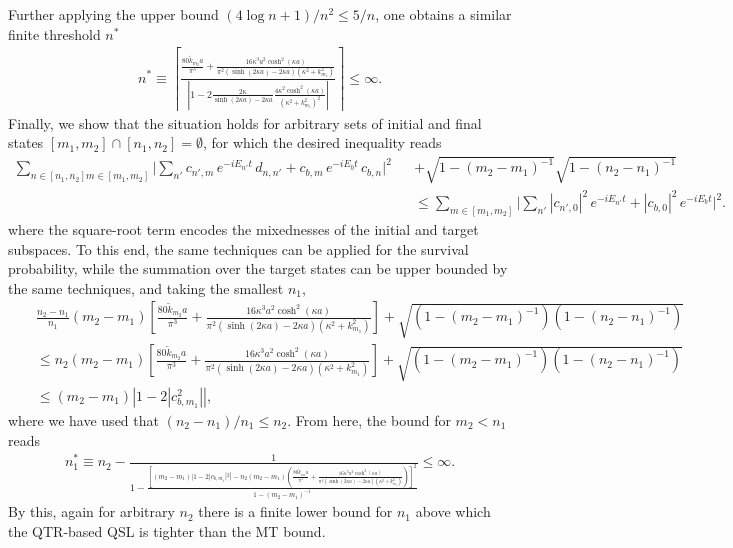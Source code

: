 \documentclass[prl,aps,amssymb,twocolumn,superscriptaddress, notitlepage, longbibliography]{revtex4-2}
\begin{document}
Further applying the upper bound $(4\log n+1)/n^2\leq 5/n$, one obtains a similar finite threshold $n^*$
\begin{eqnarray}
    n^*\equiv \left\lceil\frac{\frac{80\tilde k_{m_2}a}{\pi^3}+\frac{16\kappa^3a^2\cosh^2(\kappa a)}{\pi^2(\sinh(2\kappa a)-2\kappa a)(\kappa^2+k^2_{m_1})}}{\left\lvert1-2\frac{2\kappa}{\sinh(2\kappa a)-2\kappa a}\frac{4\kappa^2\cosh^2(\kappa a)}{(\kappa^2+k^2_{m_1})^2}\right\rvert}\right\rceil\leq \infty.
\end{eqnarray}
Finally, we show that the situation holds for arbitrary sets of initial and final states $[m_1,m_2]\cap[n_1,n_2]=\emptyset$, for which the desired inequality reads
\begin{eqnarray}
    \sum_{n\in[n_1,n_2]m\in[m_1,m_2]}\Bigg|
\sum_{n'} c_{n',m} \, e^{-i E_{n'} t} \, d_{n,n'} + c_{b,m} \, e^{-i E_b t} \, c_{b,n}
\Bigg|^2&&+\sqrt{1-(m_2-m_1)^{-1}}\sqrt{1-(n_2-n_1)^{-1}}\\
&&\leq\sum_{m\in[m_1,m_2]}\Bigg| \sum_{n'} |c_{n',0}|^2 \, e^{-i E_{n'} t} + |c_{b,0}|^2 \, e^{-i E_b t} \Bigg|^2.\nonumber
\end{eqnarray}
where the square-root term encodes the mixednesses of the initial and target subspaces.
To this end, the same techniques can be applied for the survival probability, while the summation over the target states can be upper bounded by the same techniques, and taking the smallest $n_1$,
\begin{eqnarray}
    &&\frac{n_2-n_1}{n_1}(m_2-m_1)\left[\frac{80\tilde k_{m_2}a}{\pi^3}+\frac{16\kappa^3a^2\cosh^2(\kappa a)}{\pi^2(\sinh(2\kappa a)-2\kappa a)(\kappa^2+k^2_{m_1})}\right]+\sqrt{\left(1-(m_2-m_1)^{-1}\right)\left(1-(n_2-n_1)^{-1}\right)}\\
    &&\leq n_2(m_2-m_1)\left[\frac{80\tilde k_{m_2}a}{\pi^3}+\frac{16\kappa^3a^2\cosh^2(\kappa a)}{\pi^2(\sinh(2\kappa a)-2\kappa a)(\kappa^2+k^2_{m_1})}\right]+\sqrt{\left(1-(m_2-m_1)^{-1}\right)\left(1-(n_2-n_1)^{-1}\right)}\nonumber\\
    &&\leq (m_2-m_1)\left|1-2|c_{b,m_1}^2|\right|,\nonumber
\end{eqnarray}
where we have used that $(n_2-n_1)/n_1\leq n_2$. From here, the bound for $m_2<n_1$ reads
\begin{eqnarray}
    n^*_1\equiv n_2-\frac{1}{1-\frac{\left[(m_2-m_1)|1-2|c_{b,m_1}|^2|-n_2(m_2-m_1)\left(\frac{80 \tilde k_{m_2}a}{\pi^3}+\frac{16\kappa^3a^2\cosh^2(\kappa a)}{\pi^2\left(\sinh(2\kappa a)-2\kappa a\right)(\kappa^2+k^2_{m_1})}\right)\right]^2}{1-(m_2-m_1)^{-1}}}\leq \infty.
\end{eqnarray}
By this, again for arbitrary $n_2$ there is a finite lower bound for $n_1$ above which the QTR-based QSL is tighter than the MT bound.
\end{document}
